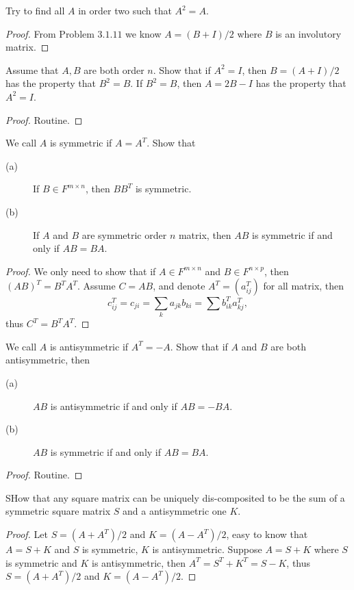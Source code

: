 \begin{pro}%
	Try to find all $A$ in order two such that $A^2=A$.
\end{pro}
\begin{proof}
	From Problem $3.1.11$ we know $A=(B+I)/2$ where $B$ is an involutory matrix.
\end{proof}

\begin{pro}%
	Assume that $A,B$ are both order $n$. Show that if $A^2=I$, then $B=(A+I)/2$ has the property that $B^2=B$. If $B^2=B$, then $A=2B-I$ has the property that $A^2=I$.
\end{pro}
\begin{proof}
	Routine.
\end{proof}

\begin{pro}%
	We call $A$ is symmetric if $A=A^T$. Show that
	\begin{description}
		\item[(a)] If $B\in F^{m\times n}$, then $BB^T$ is symmetric.
		\item[(b)] If $A$ and $B$ are symmetric order $n$ matrix, then $AB$ is symmetric if and only if $AB=BA$.
	\end{description}
\end{pro}
\begin{proof}
	We only need to show that if $A\in F^{m\times n}$ and $B\in F^{n\times p}$, then $(AB)^T=B^T A^T$.
	Assume $C=AB$, and denote $A^T=(a_{ij}^T)$ for all matrix, then
	\[c_{ij}^T=c_{ji}=\sum_k a_{jk}b_{ki}=\sum b_{ik}^Ta_{kj}^T,\]
	thus $C^T=B^T A^T$.
\end{proof}

\begin{pro}%
	We call $A$ is antisymmetric if $A^T=-A$. Show that if $A$ and $B$ are both antisymmetric, then
	\begin{description}
		\item[(a)] $AB$ is antisymmetric if and only if $AB=-BA$.
		\item[(b)] $AB$ is symmetric if and only if $AB=BA$.
	\end{description}
\end{pro}
\begin{proof}
	Routine.
\end{proof}

\begin{pro}%
	SHow that any square matrix can be uniquely dis-composited to be the sum of a symmetric square matrix $S$ and a antisymmetric one $K$.
\end{pro}
\begin{proof}
	Let $S=(A+A^T)/2$ and $K=(A-A^T)/2$, easy to know that $A=S+K$ and $S$ is symmetric, $K$ is antisymmetric. Suppose $A=S+K$ where $S$ is symmetric and $K$ is antisymmetric, then $A^T=S^T+K^T=S-K$, thus $S=(A+A^T)/2$ and $K=(A-A^T)/2$.
\end{proof}

